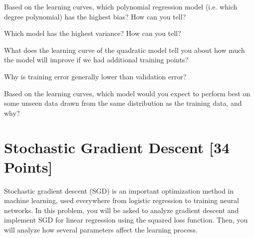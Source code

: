 \begin{problem}[3]
  Based on the learning curves, which polynomial regression model (i.e. which degree polynomial) has the highest bias? How can you tell?
\end{problem}
\begin{solution}

\end{solution}

\begin{problem}[3]
  Which model has the highest variance? How can you tell?
\end{problem}
\begin{solution}
  
\end{solution}

\begin{problem}[3]
  What does the learning curve of the quadratic model tell you about how much the model will improve if we had additional training points?
\end{problem}
\begin{solution}

\end{solution}

\begin{problem}[3]
  Why is training error generally lower than validation error?
\end{problem}
\begin{solution}
  
\end{solution}

\begin{problem}[3]
  Based on the learning curves, which model would you expect to perform best on some unseen data drawn from the same distribution as the training data, and why?
\end{problem}
\begin{solution}
  
\end{solution}





\newpage
\section{Stochastic Gradient Descent [34 Points]}

Stochastic gradient descent (SGD) is an important optimization method in machine learning, used everywhere from logistic regression to training neural networks. In this problem, you will be asked to analyze gradient descent and implement SGD for linear regression using the squared loss function. Then, you will analyze how several parameters affect the learning process.

